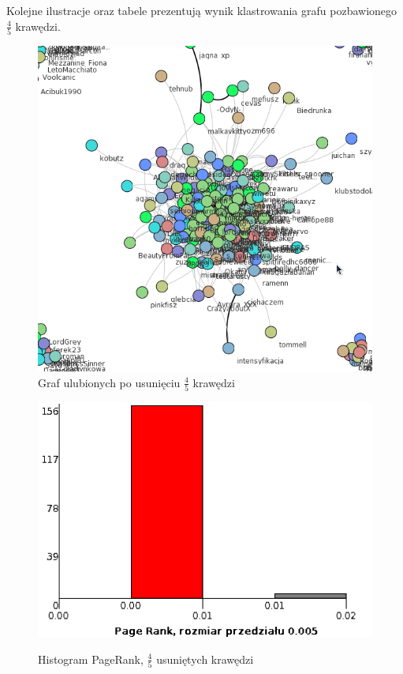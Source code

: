 \documentclass[10pt,a4paper]{article}
\begin{document}
  Kolejne ilustracje oraz tabele prezentują wynik klastrowania grafu pozbawionego  $\frac{4}{5}$  krawędzi.
\begin{figure}[H]
\centering
\caption{Graf ulubionych po usunięciu $\frac{4}{5}$ krawędzi}
\includegraphics[scale=0.5]{wyniki/final200Loved/4200loved.png}
\end{figure}

\begin{figure}[H]
\centering
\caption{Histogram PageRank, $\frac{4}{5}$ usuniętych krawędzi}
\includegraphics[scale=0.6]{wyniki/final200Loved/4200lovedPRHist.png}
\label{fig:1200lovedPRHist}
\end{figure}
\end{document}
